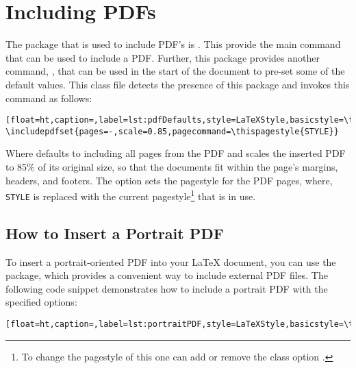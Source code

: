 \chapter{Including PDFs}\label{sec:includingpdfs}
	
	The package that is used to include PDF's is .
	This provide the main command  that can be used to include a PDF.
	Further, this package provides another command, , that can be used in the start of the document to pre-set some of the default values.
	This class file detects the presence of this package and invokes this command as follows:
	
	\begin{lstlisting}[float=ht,caption=,label=lst:pdfDefaults,style=LaTeXStyle,basicstyle=\ttfamily,]
\includepdfset{pages=-,scale=0.85,pagecommand=\thispagestyle{STYLE}}
	\end{lstlisting}
	Where  defaults to including all pages from the PDF and  scales the inserted PDF to 85\% of its original size, so that the documents fit within the page's margins, headers, and footers. The option  sets the pagestyle for the PDF pages, where, \texttt{STYLE} is replaced with the current pagestyle\footnote{To change the pagestyle of this one can add or remove the class option .} that is in use. 
	
	\section{How to Insert a Portrait PDF}
		To insert a portrait-oriented PDF into your LaTeX document, you can use the  package, which provides a convenient way to include external PDF files. 
		The following code snippet demonstrates how to include a portrait PDF with the specified options:

		\begin{lstlisting}[float=ht,caption=,label=lst:portraitPDF,style=LaTeXStyle,basicstyle=\ttfamily,]

		\end{lstlisting}

